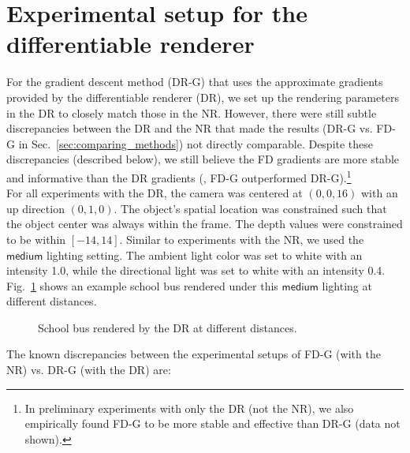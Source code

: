 \documentclass[10pt,twocolumn,letterpaper]{article}
\newcommand{\subsec}[1]{\noindent{\textbf{#1.}}}
\newcommand{\medium}{\ensuremath{\mathsf{medium}}\xspace}
\begin{document}
\section{Experimental setup for the differentiable renderer}\label{sec:dr-expr}

For the gradient descent method (DR-G) that uses the approximate gradients provided by the differentiable renderer \cite{kato2018neural} (DR), we set up the rendering parameters in the DR to closely match those in the NR.
However, there were still subtle discrepancies between the DR and the NR that made the results (DR-G vs. FD-G in Sec.~\ref{sec:comparing_methods}) not directly comparable.
Despite these discrepancies (described below), we still believe the FD gradients are more stable and informative than the DR gradients (\ie, FD-G outperformed DR-G).\footnote{In preliminary experiments with only the DR (not the NR), we also empirically found FD-G to be more stable and effective than DR-G (data not shown).}\\

\subsec{DR setup} 
For all experiments with the DR, the camera was centered at \((0, 0, 16)\) with an up direction \((0, 1, 0)\). 
The object's spatial location was constrained such that the object center was always within the frame.
The depth values were constrained to be within \([-14, 14]\).
Similar to experiments with the NR, we used the \medium lighting setting.
The ambient light color was set to white with an intensity 1.0, while the directional light was set to white with an intensity 0.4.  
Fig.~\ref{fig:dr-demo} shows an example school bus rendered under this \medium lighting at different distances.

\begin{figure}[ht]
  \centering
  \caption{School bus rendered by the DR at different distances.}\label{fig:dr-demo}
\end{figure}


The known discrepancies between the experimental setups of FD-G (with the NR) vs. DR-G (with the DR) are:
\end{document}
